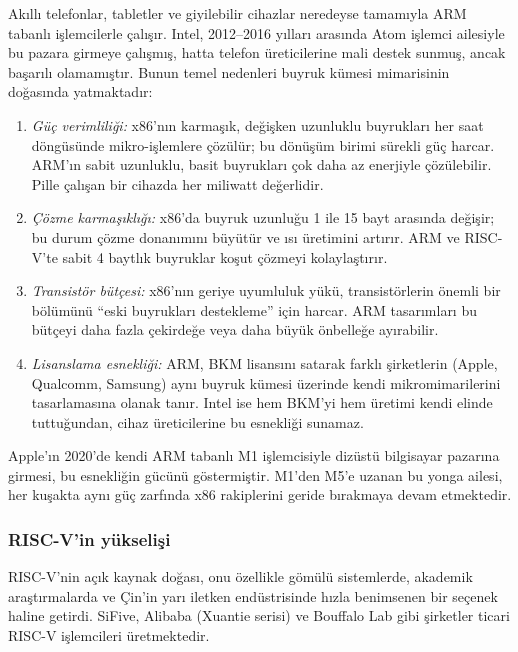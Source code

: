 \begin{bilginot}
Akıllı telefonlar, tabletler ve giyilebilir cihazlar neredeyse tamamıyla ARM tabanlı işlemcilerle çalışır. Intel, 2012--2016 yılları arasında Atom işlemci ailesiyle bu pazara girmeye çalışmış, hatta telefon üreticilerine mali destek sunmuş, ancak başarılı olamamıştır. Bunun temel nedenleri buyruk kümesi mimarisinin doğasında yatmaktadır:

\begin{enumerate}[nosep]
\item \emph{Güç verimliliği:} x86'nın karmaşık, değişken uzunluklu buyrukları her saat döngüsünde mikro-işlemlere çözülür; bu dönüşüm birimi sürekli güç harcar. ARM'ın sabit uzunluklu, basit buyrukları çok daha az enerjiyle çözülebilir. Pille çalışan bir cihazda her miliwatt değerlidir.
\item \emph{Çözme karmaşıklığı:} x86'da buyruk uzunluğu 1 ile 15 bayt arasında değişir; bu durum çözme donanımını büyütür ve ısı üretimini artırır. ARM ve RISC-V'te sabit 4 baytlık buyruklar koşut çözmeyi kolaylaştırır.
\item \emph{Transistör bütçesi:} x86'nın geriye uyumluluk yükü, transistörlerin önemli bir bölümünü ``eski buyrukları destekleme'' için harcar. ARM tasarımları bu bütçeyi daha fazla çekirdeğe veya daha büyük önbelleğe ayırabilir.
\item \emph{Lisanslama esnekliği:} ARM, BKM lisansını satarak farklı şirketlerin (Apple, Qualcomm, Samsung) aynı buyruk kümesi üzerinde kendi mikromimarilerini tasarlamasına olanak tanır. Intel ise hem BKM'yi hem üretimi kendi elinde tuttuğundan, cihaz üreticilerine bu esnekliği sunamaz.
\end{enumerate}

Apple'ın 2020'de kendi ARM tabanlı M1 işlemcisiyle dizüstü bilgisayar pazarına girmesi, bu esnekliğin gücünü göstermiştir. M1'den M5'e uzanan bu yonga ailesi, her kuşakta aynı güç zarfında x86 rakiplerini geride bırakmaya devam etmektedir.
\end{bilginot}

\subsubsection*{RISC-V'in yükselişi}
RISC-V'nin açık kaynak doğası, onu özellikle gömülü sistemlerde, akademik araştırmalarda ve Çin'in yarı iletken endüstrisinde hızla benimsenen bir seçenek haline getirdi. SiFive, Alibaba (Xuantie serisi) ve Bouffalo Lab gibi şirketler ticari RISC-V işlemcileri üretmektedir.

